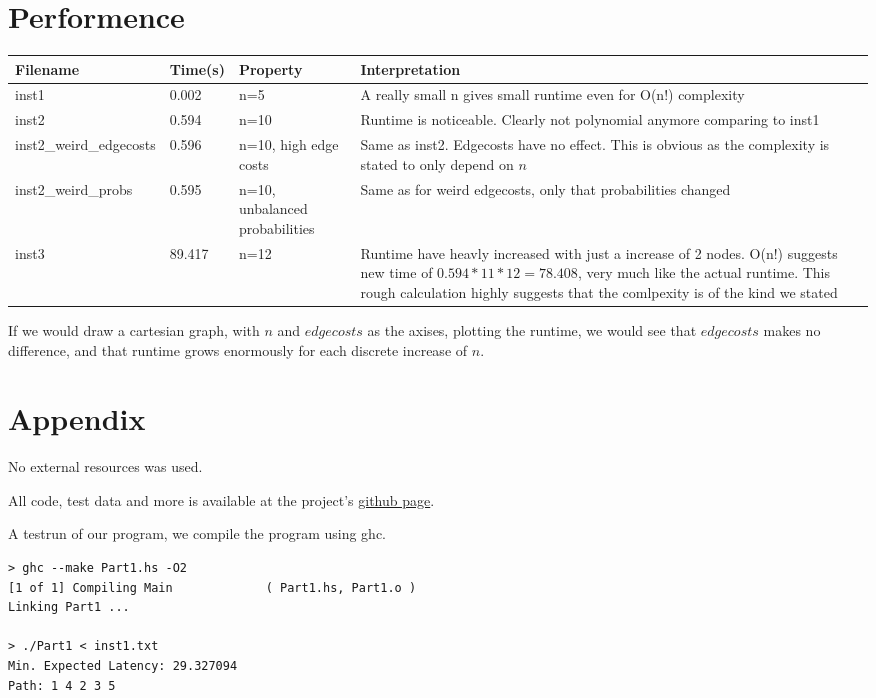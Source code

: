 \documentclass[a4paper,11pt]{article}
\begin{document}
\section{Performence}

\begin{center}
    \begin{tabular}{ | l | l | p{4cm} | p{5cm} |}
    \hline
    Filename & Time(s) & Property & Interpretation \\ \hline
    inst1 & 0.002 & n=5 & A really small n gives small runtime even for O(n!) complexity\\ \hline
    inst2 & 0.594 & n=10 & Runtime is noticeable. Clearly not polynomial anymore comparing to inst1 \\ \hline
    inst2\_weird\_edgecosts & 0.596 & n=10, high edge costs & Same as inst2. Edgecosts have no effect.
        This is obvious as the complexity is stated to only depend on $n$ \\ \hline
    inst2\_weird\_probs & 0.595 & n=10, unbalanced probabilities & Same as for weird edgecosts, only that probabilities changed \\ \hline
    inst3 & 89.417 & n=12 & Runtime have heavly increased with just a increase of 2 nodes.
        O(n!) suggests new time of $0.594*11*12=78.408$, very much like the actual runtime. 
        This rough calculation highly suggests that the comlpexity is of the kind we stated \\ \hline
    \end{tabular}
\end{center}

If we would draw a cartesian graph, with $n$ and $edgecosts$ as the axises, plotting the runtime,
we would see that $edgecosts$ makes no difference, and that runtime grows enormously for each
discrete increase of $n$.

\section{Appendix}
No external resources was used.

All code, test data and more is available at the project's \href{https://github.com/bisforboman/Algorithms-TIN092}{github page}.

A testrun of our program, we compile the program using ghc.

\begin{lstlisting}
> ghc --make Part1.hs -O2
[1 of 1] Compiling Main             ( Part1.hs, Part1.o )
Linking Part1 ...

> ./Part1 < inst1.txt 
Min. Expected Latency: 29.327094
Path: 1 4 2 3 5

\end{lstlisting}
\end{document}
